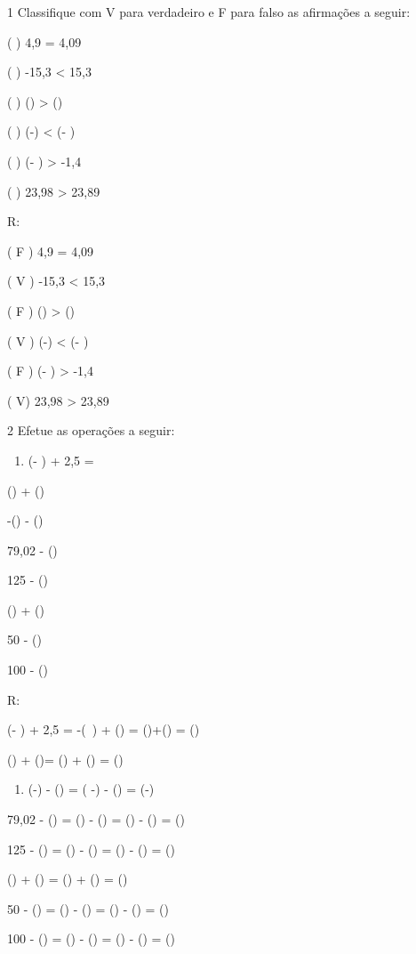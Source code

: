 \num{1} Classifique com V para verdadeiro e F para falso as afirmações a
seguir:

( ) 4,9 = 4,09

( ) -15,3 \textless{} 15,3

( ) () \textgreater{} ()

( ) (-) \textless{} (- )

( ) (- ) \textgreater{} -1,4

( ) 23,98 \textgreater{} 23,89

R:

( F ) 4,9 = 4,09

( V ) -15,3 \textless{} 15,3

( F ) () \textgreater{} ()

( V ) (-) \textless{} (- )

( F ) (- ) \textgreater{} -1,4

( V) 23,98 \textgreater{} 23,89

\num{2} Efetue as operações a seguir:

\begin{enumerate}
\def\labelenumi{\alph{enumi})}
\tightlist
\item
  (- ) + 2,5 =
\end{enumerate}
\item () + ()
\item -() - ()
\item 79,02 - ()
\item 125 - ()
\item () + ()
\item 50 - ()
\item 100 - ()

R:
\item(- ) + 2,5 = -(\ ) + () =
()+() = ()
\item () + ()= () +
() = ()

\begin{enumerate}
\def\labelenumi{\alph{enumi})}
\setcounter{enumi}{2}
\tightlist
\item
  (-) - () = ( -) -
  () = (-)
\end{enumerate}
\item 79,02 - () = () - () =
() - () = ()
\item 125 - () = () - () =
() - () = ()
\item () + () = () +
() = ()
\item 50 - () = () - () =
() - () = ()
\item 100 - () = () - () =
() - () = ()

